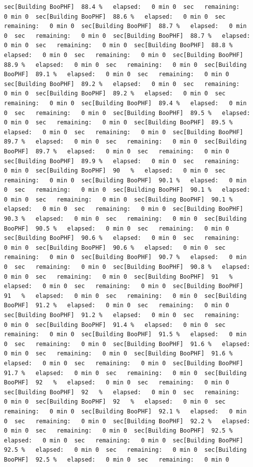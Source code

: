 \documentclass[
]{book}
\begin{document}
\begin{verbatim}
sec[Building BooPHF]  88.4 %   elapsed:   0 min 0  sec   remaining:   0 min 0  sec[Building BooPHF]  88.6 %   elapsed:   0 min 0  sec   remaining:   0 min 0  sec[Building BooPHF]  88.7 %   elapsed:   0 min 0  sec   remaining:   0 min 0  sec[Building BooPHF]  88.7 %   elapsed:   0 min 0  sec   remaining:   0 min 0  sec[Building BooPHF]  88.8 %   elapsed:   0 min 0  sec   remaining:   0 min 0  sec[Building BooPHF]  88.9 %   elapsed:   0 min 0  sec   remaining:   0 min 0  sec[Building BooPHF]  89.1 %   elapsed:   0 min 0  sec   remaining:   0 min 0  sec[Building BooPHF]  89.2 %   elapsed:   0 min 0  sec   remaining:   0 min 0  sec[Building BooPHF]  89.2 %   elapsed:   0 min 0  sec   remaining:   0 min 0  sec[Building BooPHF]  89.4 %   elapsed:   0 min 0  sec   remaining:   0 min 0  sec[Building BooPHF]  89.5 %   elapsed:   0 min 0  sec   remaining:   0 min 0  sec[Building BooPHF]  89.5 %   elapsed:   0 min 0  sec   remaining:   0 min 0  sec[Building BooPHF]  89.7 %   elapsed:   0 min 0  sec   remaining:   0 min 0  sec[Building BooPHF]  89.7 %   elapsed:   0 min 0  sec   remaining:   0 min 0  sec[Building BooPHF]  89.9 %   elapsed:   0 min 0  sec   remaining:   0 min 0  sec[Building BooPHF]  90   %   elapsed:   0 min 0  sec   remaining:   0 min 0  sec[Building BooPHF]  90.1 %   elapsed:   0 min 0  sec   remaining:   0 min 0  sec[Building BooPHF]  90.1 %   elapsed:   0 min 0  sec   remaining:   0 min 0  sec[Building BooPHF]  90.1 %   elapsed:   0 min 0  sec   remaining:   0 min 0  sec[Building BooPHF]  90.3 %   elapsed:   0 min 0  sec   remaining:   0 min 0  sec[Building BooPHF]  90.5 %   elapsed:   0 min 0  sec   remaining:   0 min 0  sec[Building BooPHF]  90.6 %   elapsed:   0 min 0  sec   remaining:   0 min 0  sec[Building BooPHF]  90.6 %   elapsed:   0 min 0  sec   remaining:   0 min 0  sec[Building BooPHF]  90.7 %   elapsed:   0 min 0  sec   remaining:   0 min 0  sec[Building BooPHF]  90.8 %   elapsed:   0 min 0  sec   remaining:   0 min 0  sec[Building BooPHF]  91   %   elapsed:   0 min 0  sec   remaining:   0 min 0  sec[Building BooPHF]  91   %   elapsed:   0 min 0  sec   remaining:   0 min 0  sec[Building BooPHF]  91.2 %   elapsed:   0 min 0  sec   remaining:   0 min 0  sec[Building BooPHF]  91.2 %   elapsed:   0 min 0  sec   remaining:   0 min 0  sec[Building BooPHF]  91.4 %   elapsed:   0 min 0  sec   remaining:   0 min 0  sec[Building BooPHF]  91.5 %   elapsed:   0 min 0  sec   remaining:   0 min 0  sec[Building BooPHF]  91.6 %   elapsed:   0 min 0  sec   remaining:   0 min 0  sec[Building BooPHF]  91.6 %   elapsed:   0 min 0  sec   remaining:   0 min 0  sec[Building BooPHF]  91.7 %   elapsed:   0 min 0  sec   remaining:   0 min 0  sec[Building BooPHF]  92   %   elapsed:   0 min 0  sec   remaining:   0 min 0  sec[Building BooPHF]  92   %   elapsed:   0 min 0  sec   remaining:   0 min 0  sec[Building BooPHF]  92   %   elapsed:   0 min 0  sec   remaining:   0 min 0  sec[Building BooPHF]  92.1 %   elapsed:   0 min 0  sec   remaining:   0 min 0  sec[Building BooPHF]  92.2 %   elapsed:   0 min 0  sec   remaining:   0 min 0  sec[Building BooPHF]  92.5 %   elapsed:   0 min 0  sec   remaining:   0 min 0  sec[Building BooPHF]  92.5 %   elapsed:   0 min 0  sec   remaining:   0 min 0  sec[Building BooPHF]  92.5 %   elapsed:   0 min 0  sec   remaining:   0 min 0  
\end{verbatim}
\end{document}

